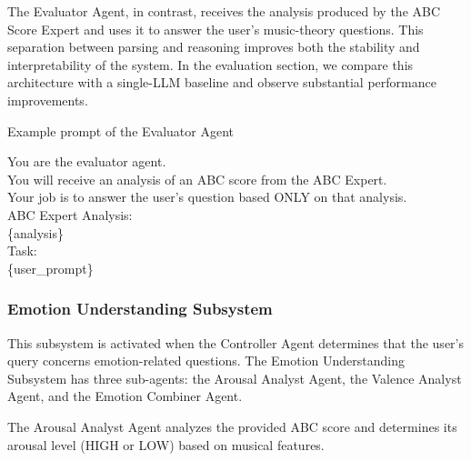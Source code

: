 \documentclass[sigconf]{acmart}
\begin{document}
The Evaluator Agent, in contrast, receives the analysis produced by the ABC Score Expert and uses it to answer the user’s music-theory questions.
This separation between parsing and reasoning improves both the stability and interpretability of the system. In the evaluation section, we compare this architecture with a single-LLM baseline and observe substantial performance improvements.

\begin{promptbox}{Example prompt of the Evaluator Agent}

You are the evaluator agent.\\

You will receive an analysis of an ABC score from the ABC Expert.\\
Your job is to answer the user's question based ONLY on that analysis.\\

ABC Expert Analysis:\\
\{analysis\}\\

Task:\\
\{user\_prompt\}\\

\end{promptbox}

\subsubsection{Emotion Understanding Subsystem}
This subsystem is activated when the Controller Agent determines that the user's query concerns emotion-related questions. The Emotion Understanding Subsystem has three sub-agents: the Arousal Analyst Agent, the Valence Analyst Agent, and the Emotion Combiner Agent. 

The Arousal Analyst Agent analyzes the provided ABC score and determines its arousal level (HIGH or LOW) based on musical features.
\end{document}
